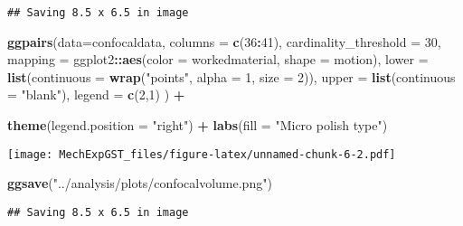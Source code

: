 \documentclass[
]{article}
\newenvironment{Shaded}{\begin{snugshade}}{\end{snugshade}}
\newcommand{\DataTypeTok}[1]{\textcolor[rgb]{0.13,0.29,0.53}{#1}}
\newcommand{\DecValTok}[1]{\textcolor[rgb]{0.00,0.00,0.81}{#1}}
\newcommand{\KeywordTok}[1]{\textcolor[rgb]{0.13,0.29,0.53}{\textbf{#1}}}
\newcommand{\NormalTok}[1]{#1}
\newcommand{\OperatorTok}[1]{\textcolor[rgb]{0.81,0.36,0.00}{\textbf{#1}}}
\newcommand{\StringTok}[1]{\textcolor[rgb]{0.31,0.60,0.02}{#1}}
\begin{document}
\begin{verbatim}
## Saving 8.5 x 6.5 in image
\end{verbatim}

\begin{Shaded}
\begin{Highlighting}[]
\KeywordTok{ggpairs}\NormalTok{(}\DataTypeTok{data=}\NormalTok{confocaldata,}
        \DataTypeTok{columns =} \KeywordTok{c}\NormalTok{(}\DecValTok{36}\OperatorTok{:}\DecValTok{41}\NormalTok{),}
        \DataTypeTok{cardinality_threshold =} \DecValTok{30}\NormalTok{,}
        \DataTypeTok{mapping =}\NormalTok{ ggplot2}\OperatorTok{::}\KeywordTok{aes}\NormalTok{(}\DataTypeTok{color =}\NormalTok{ workedmaterial, }\DataTypeTok{shape =}\NormalTok{ motion),}
        \DataTypeTok{lower =} \KeywordTok{list}\NormalTok{(}\DataTypeTok{continuous =} \KeywordTok{wrap}\NormalTok{(}\StringTok{"points"}\NormalTok{, }\DataTypeTok{alpha =} \DecValTok{1}\NormalTok{, }\DataTypeTok{size =} \DecValTok{2}\NormalTok{)),}
        \DataTypeTok{upper =} \KeywordTok{list}\NormalTok{(}\DataTypeTok{continuous =} \StringTok{"blank"}\NormalTok{),}
        \DataTypeTok{legend =} \KeywordTok{c}\NormalTok{(}\DecValTok{2}\NormalTok{,}\DecValTok{1}\NormalTok{)}
\NormalTok{        ) }\OperatorTok{+}

\StringTok{    }\KeywordTok{theme}\NormalTok{(}\DataTypeTok{legend.position =} \StringTok{"right"}\NormalTok{) }\OperatorTok{+}
\StringTok{  }\KeywordTok{labs}\NormalTok{(}\DataTypeTok{fill =} \StringTok{"Micro polish type"}\NormalTok{)}
\end{Highlighting}
\end{Shaded}

\texttt{[image: MechExpGST\_files/figure-latex/unnamed-chunk-6-2.pdf]}

\begin{Shaded}
\begin{Highlighting}[]
\KeywordTok{ggsave}\NormalTok{(}\StringTok{"../analysis/plots/confocalvolume.png"}\NormalTok{)}
\end{Highlighting}
\end{Shaded}

\begin{verbatim}
## Saving 8.5 x 6.5 in image
\end{verbatim}
\end{document}
